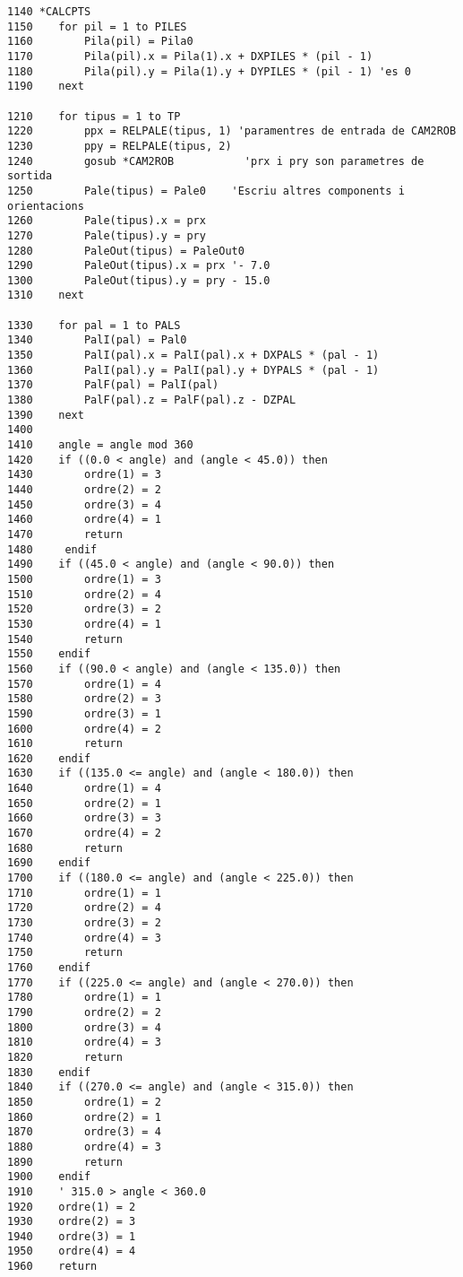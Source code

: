 \label{casosrot}
\begin{verbatim}
1140 *CALCPTS
1150    for pil = 1 to PILES
1160        Pila(pil) = Pila0
1170        Pila(pil).x = Pila(1).x + DXPILES * (pil - 1)
1180        Pila(pil).y = Pila(1).y + DYPILES * (pil - 1) 'es 0
1190    next
    
1210    for tipus = 1 to TP
1220        ppx = RELPALE(tipus, 1) 'paramentres de entrada de CAM2ROB
1230        ppy = RELPALE(tipus, 2)
1240        gosub *CAM2ROB           'prx i pry son parametres de sortida
1250        Pale(tipus) = Pale0    'Escriu altres components i orientacions
1260        Pale(tipus).x = prx
1270        Pale(tipus).y = pry
1280        PaleOut(tipus) = PaleOut0
1290        PaleOut(tipus).x = prx '- 7.0
1300        PaleOut(tipus).y = pry - 15.0
1310    next
 
1330    for pal = 1 to PALS
1340        PalI(pal) = Pal0
1350        PalI(pal).x = PalI(pal).x + DXPALS * (pal - 1)
1360        PalI(pal).y = PalI(pal).y + DYPALS * (pal - 1)
1370        PalF(pal) = PalI(pal)
1380        PalF(pal).z = PalF(pal).z - DZPAL
1390    next
1400 	
1410    angle = angle mod 360
1420    if ((0.0 < angle) and (angle < 45.0)) then
1430        ordre(1) = 3
1440        ordre(2) = 2
1450        ordre(3) = 4
1460        ordre(4) = 1
1470        return
1480     endif
1490    if ((45.0 < angle) and (angle < 90.0)) then 
1500        ordre(1) = 3
1510        ordre(2) = 4
1520        ordre(3) = 2
1530        ordre(4) = 1
1540        return
1550    endif
1560    if ((90.0 < angle) and (angle < 135.0)) then
1570        ordre(1) = 4
1580        ordre(2) = 3
1590        ordre(3) = 1
1600        ordre(4) = 2
1610        return
1620    endif
1630    if ((135.0 <= angle) and (angle < 180.0)) then
1640        ordre(1) = 4
1650        ordre(2) = 1
1660        ordre(3) = 3
1670        ordre(4) = 2
1680        return
1690    endif
1700    if ((180.0 <= angle) and (angle < 225.0)) then 
1710        ordre(1) = 1
1720        ordre(2) = 4
1730        ordre(3) = 2
1740        ordre(4) = 3
1750        return
1760    endif
1770    if ((225.0 <= angle) and (angle < 270.0)) then
1780        ordre(1) = 1
1790        ordre(2) = 2
1800        ordre(3) = 4
1810        ordre(4) = 3
1820        return
1830    endif
1840    if ((270.0 <= angle) and (angle < 315.0)) then 
1850        ordre(1) = 2
1860        ordre(2) = 1
1870        ordre(3) = 4
1880        ordre(4) = 3
1890        return
1900    endif
1910    ' 315.0 > angle < 360.0
1920    ordre(1) = 2
1930    ordre(2) = 3
1940    ordre(3) = 1
1950    ordre(4) = 4
1960    return
\end{verbatim}


